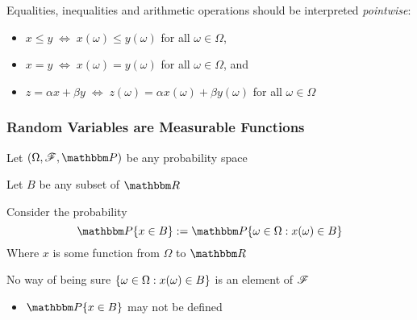 \begin{frame}

    \vspace{2em}
    Equalities, inequalities and arithmetic operations should be
    interpreted \emph{pointwise}:
    \begin{itemize}
        \item $x \leq y \; \iff \; x(\omega) \leq y(\omega)$ for all $\omega \in
        \Omega$,
        \item $x = y \; \iff \; x(\omega) = y(\omega)$ for all $\omega \in
        \Omega$, and
        \item $z = \alpha x + \beta y \; \iff \; z(\omega) = \alpha x(\omega) +
            \beta y(\omega)$ for all $\omega \in \Omega$
    \end{itemize}

\end{frame}

\begin{frame}\frametitle{Random Variables are Measurable Functions}

    \vspace{2em}
    Let $(\Omega, \fF, \PP)$ be any probability space
    
    Let $B$ be
    any subset of $\RR$
    
    Consider the probability
    \begin{equation*}
        \PP\{x \in B\}
        := \PP\setntn{\omega \in \Omega}{x(\omega) \in B}
    \end{equation*}
    Where $x$ is some function from $\Omega$ to $\RR$
    
    No way of being sure $\{ \omega \in \Omega : x(\omega) \in B \}$ is an element of
    $\mathscr F$
    \begin{itemize}
        \item $\PP\{x \in B\}$ may not be defined
    \end{itemize}
    
\end{frame}

